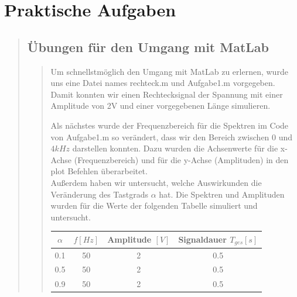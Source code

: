 
\section{Praktische Aufgaben}

    \begin{quote}
        \subsection{Übungen für den Umgang mit MatLab}
		\begin{quote}
		
		Um schnellstmöglich den Umgang mit MatLab zu erlernen, wurde uns eine Datei
		names rechteck.m und Aufgabe1.m vorgegeben. Damit konnten wir einen
		Rechtecksignal der Spannung mit einer Amplitude von 2V und einer
		vorgegebenen Länge simulieren.
		
		\vspace{1em}
		
		Als nächstes wurde der Frequenzbereich für die
		Spektren im Code von Aufgabe1.m so verändert, dass wir den Bereich zwischen $0$
		und $4kHz$ darstellen konnten. Dazu wurden die Achsenwerte für die x-Achse
		(Frequenzbereich) und für die y-Achse (Amplituden) in den plot Befehlen
		überarbeitet.\\
		Außerdem haben wir untersucht, welche Auswirkunden die Veränderung des
		Tastgrads $\alpha$ hat. Die Spektren und Amplituden wurden für die Werte der
		folgenden Tabelle simuliert und untersucht.
		
		\vspace{1em}
		
			\begin{center}
                 \begin{tabular}{|c|c|c|c|}
                     
                  \hline
                   $\alpha $ & $f[Hz]$ & Amplitude $[V]$ & Signaldauer
                   $T_{ges}[s]$\\ \hline
                   0.1 & 50 & 2 & 0.5 \\ \hline
                   0.5 & 50 & 2 & 0.5 \\ \hline
                   0.9 & 50 & 2 & 0.5 \\ \hline           
   

\end{tabular}
\end{center}
\end{quote}
\end{quote}
